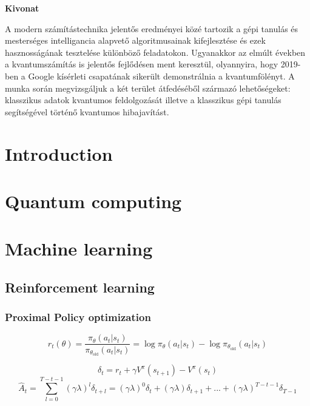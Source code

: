\documentclass[12pt, a4paper]{article}
\begin{document}
\begin{center}
    \textbf{Kivonat}\\
    \par A modern számítástechnika jelentős eredményei közé tartozik a gépi
    tanulás és mesterséges intelligancia alapvető algoritmusainak kifejlesztése és ezek 
    hasznosságának tesztelése különböző feladatokon. Ugyanakkor az elmúlt években a 
    kvantumszámítás is jelentős fejlődésen ment keresztül, olyannyira, hogy 2019-ben a Google kísérleti
    csapatának sikerült demonstrálnia a kvantumfölényt. A munka során megvizsgáljuk a két terület átfedéséből 
    származó lehetőségeket: klasszikus adatok kvantumos feldolgozását illetve a klasszikus
    gépi tanulás segítségével történő kvantumos hibajavítást.
\end{center}
\thispagestyle{empty} %
\newpage

\thispagestyle{empty}
\tableofcontents
\newpage

\thispagestyle{empty}
\listoffigures
\newpage

\section{Introduction}
\section{Quantum computing}


\section{Machine learning}
\subsection{Reinforcement learning}
\subsubsection{Proximal Policy optimization}
\begin{equation}
r_t(\theta) = \frac{\pi_{\theta}(a_t|s_t)}{\pi_{\theta_{\textrm{old}}}(a_t|s_t)}
= \log\pi_{\theta}(a_t|s_t) - \log \pi_{\theta_{\textrm{old}}}(a_t|s_t)
\end{equation}

\begin{equation}
    \delta_t = r_t + \gamma V^{\pi}(s_{t+1}) - V^{\pi}(s_t) 
\end{equation}
\begin{equation}
    \hat A_t = \sum\limits_{l=0}^{T-t-1} (\gamma\lambda)^{l}\delta_{t+l}
    = (\gamma\lambda)^0\delta_t + (\gamma\lambda)\delta_{t+1} + ... + (\gamma\lambda)^{T-t-1}\delta_{T-1}
\end{equation}
\end{document}

